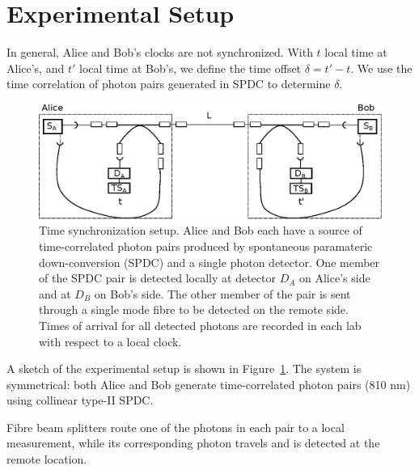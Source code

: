 \documentclass[aps,pra,onecolumn, superscriptaddress]{revtex4}
\begin{document}
\section{Experimental Setup}
      
In general, Alice and Bob's clocks are not synchronized.
With $t$ local time at Alice's, and $ t'$ local time at Bob's,
we define the time offset $\delta = t' - t$.
We use the time correlation of photon pairs generated in SPDC to determine $\delta$.

\begin{figure}[htbp]
  \centering
  \includegraphics[width=16cm]{figures/setup_simplified.eps}
  \caption{\label{fig:setup}
  Time synchronization setup. Alice and Bob each have a source of time-correlated photon pairs produced by spontaneous paramateric down-conversion (SPDC) and a single photon detector. One member of the SPDC pair is detected locally at detector $D_A$ on Alice's side and at $D_B$ on Bob's side. The other member of the pair is sent through a single mode fibre to be detected on the remote side. Times of arrival for all detected photons are recorded in each lab with respect to a local clock. 
  }
\end{figure}

A sketch of the experimental setup is shown in Figure~\ref{fig:setup}.
The system is symmetrical: both Alice and Bob generate time-correlated photon pairs (810 nm) using collinear type-II SPDC.

Fibre beam splitters route one of the photons in each pair to a local measurement, while its corresponding photon travels and is detected at the remote location.
\end{document}
